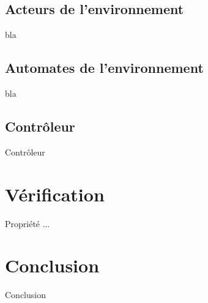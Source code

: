 \documentclass{bredelebeamer}
\begin{document}
\subsection{Acteurs de l'environnement}
\begin{frame}{bla}

\end{frame}

\subsection{Automates de l'environnement}
\begin{frame}{bla}

\end{frame}

\subsection{Contrôleur}
\begin{frame}{Contrôleur}

\end{frame}

\section{Vérification}
\begin{frame}{Propriété ...}

\end{frame}

\section{Conclusion}
\begin{frame}{Conclusion}

\end{frame}
\end{document}
